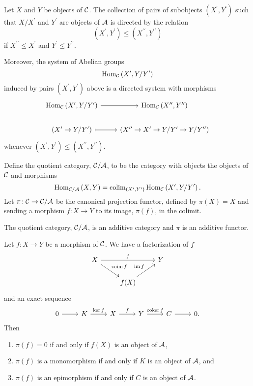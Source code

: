 \documentclass[dissertation.tex]{subfiles}
\begin{document}
\begin{prop}
  Let $X$ and $Y$ be objects of $\mathcal{C}$.
  The collection of pairs of subobjects $(X^\prime, Y^\prime)$ such that $X/X^\prime$ and $Y^\prime$ are objects of $\mathcal{A}$ is directed by the relation
  $$(X^\prime, Y^\prime) \leq (X^{\prime\prime}, Y^{\prime\prime})$$
  if $X^{\prime\prime} \leq X^\prime$ and $Y^\prime \leq Y^{\prime\prime}$.
  
  Moreover, the system of Abelian groups
  $$\operatorname{Hom}_{\mathcal{C}}\left(X^\prime, Y/Y^\prime\right)$$
  induced by pairs $(X^\prime, Y^\prime)$ above is a directed system with morphisms
  $$\begin{tikzcd}
    \Hom{\C}{X^\prime, Y/Y^\prime} \arrow{r} &\Hom{\C}{X^{\prime\prime}, Y^{\prime\prime}}\\
    (X^\prime \rightarrow Y/Y^\prime) \arrow[mapsto]{r} & (X^{\prime\prime} \rightarrow X^\prime \rightarrow Y/Y^\prime \rightarrow Y/Y^{\prime\prime})
  \end{tikzcd}$$
  whenever $(X^\prime, Y^\prime) \leq (X^{\prime\prime}, Y^{\prime\prime})$.
\end{prop}

\begin{defn}
  Define the quotient category, $\mathcal{C}/\mathcal{A}$, to be the category with objects the objects of $\mathcal{C}$ and morphisms
  $$\operatorname{Hom}_{\mathcal{C}/\mathcal{A}}\left(X, Y\right) = \operatorname{colim}_{(X^\prime, Y^\prime)} \operatorname{Hom}_{\mathcal{C}}\left(X^\prime, Y/Y^\prime\right).$$
  Let $\pi \colon \mathcal{C} \rightarrow \mathcal{C}/\mathcal{A}$ be the canonical projection functor, defined by $\pi(X) = X$ and sending a morphism $f \colon X \rightarrow Y$ to its image, $\pi(f)$, in the colimit.
\end{defn}

\begin{lem}
  The quotient category, $\mathcal{C}/\mathcal{A}$, is an additive category and $\pi$ is an additive functor.
\end{lem}

\begin{lem}
  Let $f \colon X \rightarrow Y$ be a morphism of $\mathcal{C}$.  
  We have a factorization of $f$
  $$\begin{tikzcd}
    X \arrow{rd}{\coim{f}}\arrow{rr}{f} & & Y\\
    & f(X)\arrow{ur}{\im{f}} & 
  \end{tikzcd}$$
  and an exact sequence 
  $$\begin{tikzcd}
    0 \arrow{r} & K \arrow{r}{\ker{f}} & X \arrow{r}{f} & Y \arrow{r}{\coker{f}} & C \arrow{r} & 0.
  \end{tikzcd}$$
  Then
  \begin{enumerate}
  \item
    $\pi(f) = 0$ if and only if $f(X)$ is an object of $\mathcal{A}$,
  \item
    $\pi(f)$ is a monomorphism if and only if $K$ is an object of $\mathcal{A}$, and
  \item
    $\pi(f)$ is an epimorphism if and only if $C$ is an object of $\mathcal{A}$.
  \end{enumerate}
\end{lem}
\end{document}
